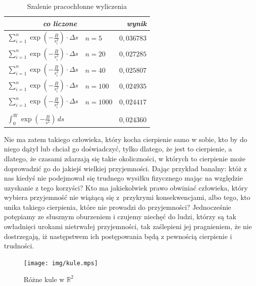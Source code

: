 \documentclass[12pt]{mwbk}
\theoremstyle{plain}
\theoremstyle{definition}
\theoremstyle{remark}
\newcommand\R{\mathbb{R}}
\begin{document}
\begin{table}
	\centering
	\caption{Szalenie pracochłonne wyliczenia}
	\label{tab:wyliczenia}
	  {\small
	  \begin{tabular}{llr}
	    \toprule
		  \multicolumn{2}{c}{\textit{co liczone}} & \textit{wynik}  \\
		  \midrule
		  $\displaystyle\sum_{i=1}^n\exp\left(-\frac{B}{s_i^2}\right)\cdot\Delta
		  s$ & $n=5$ & $0{,}036783$\\
		  $\displaystyle\sum_{i=1}^n\exp\left(-\frac{B}{s_i^2}\right)\cdot\Delta
		  s$ & $n=20$ & $0{,}027285$\\
		  $\displaystyle\sum_{i=1}^n\exp\left(-\frac{B}{s_i^2}\right)\cdot\Delta
		  s$ & $n=40$ & $0{,}025807$\\
		  $\displaystyle\sum_{i=1}^n\exp\left(-\frac{B}{s_i^2}\right)\cdot\Delta
		  s$ & $n=100$ & $0{,}024935$\\
		  $\displaystyle\sum_{i=1}^n\exp\left(-\frac{B}{s_i^2}\right)\cdot\Delta
		  s$ & $n=1000$ & $0{,}024417$\\
		  \multicolumn{3}{c}{\dotfill}\\
		  \multicolumn{2}{l}{$\displaystyle\int_0^W\exp\left(-\frac{B}{s^2}\right)\,ds$}&
		  $0{,}024360$\\
		  \bottomrule
	  \end{tabular}
	}
\end{table}

Nie ma zatem takiego człowieka, który kocha cierpienie samo w sobie, 
kto by do niego dążył lub chciał go doświadczyć, tylko dlatego, że
jest to cierpienie, a dlatego, że czasami zdarzają się takie 
okoliczności, w których to cierpienie może doprowadzić 
go do jakiejś wielkiej przyjemności. 
Dając przykład banalny: któż z nas kiedyś nie podejmował 
się trudnego wysiłku fizycznego mając na względzie 
uzyskanie z tego korzyści? 
Kto ma jakiekolwiek prawo obwiniać człowieka, 
który wybiera przyjemność nie wiążącą się z~przykrymi 
konsekwencjami, albo tego, kto unika takiego cierpienia, 
które nie prowadzi do przyjemności? 
Jednocześnie potępiamy ze słusznym oburzeniem i czujemy 
niechęć do ludzi, którzy są tak owładnięci urokami nietrwałej 
przyjemności, tak zaślepieni jej pragnieniem, 
że nie dostrzegają, iż następstwem ich 
postępowania będą z pewnością cierpienie i trudności.



\begin{figure}[tp]
	\centering
		\texttt{[image: img/kule.mps]}
	\caption{Różne kule w $\R^2$}
	\label{fig:kule}
\end{figure}
\end{document}
